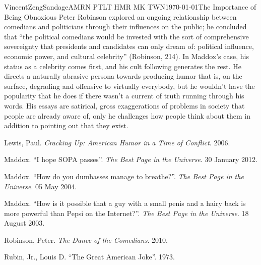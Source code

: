 \documentclass[12 pt]{article}
\begin{document}
\begin{mla}{Vincent}{Zeng}{Sandage}{AMRN PTLT HMR MK TWN}{\today}{The Importance of Being Obnoxious}
	Peter Robinson explored an ongoing relationship between comedians and politicians through their influences on the public; he concluded that ``the political comedians would be invested with the sort of comprehensive sovereignty that presidents and candidates can only dream of: political influence, economic power, and cultural celebrity'' (Robinson, 214). In Maddox's case, his status as a celebrity comes first, and his cult following generates the rest. He directs a naturally abrasive persona towards producing humor that is, on the surface, degrading and offensive to virtually everybody, but he wouldn't have the popularity that he does if there wasn't a current of truth running through his words. His essays are satirical, gross exaggerations of problems in society that people are already aware of, only he challenges how people think about them in addition to pointing out that they exist.

\begin{workscited}

\bibent Lewis, Paul. \textit{Cracking Up: American Humor in a Time of Conflict}. 2006.

\bibent Maddox. ``I hope SOPA passes''. \textit{The Best Page in the Universe}. 30 January 2012. 

\bibent Maddox. ``How do you dumbasses manage to breathe?''. \textit{The Best Page in the Universe}. 05 May 2004. 

\bibent Maddox. ``How is it possible that a guy with a small penis and a hairy back is more powerful than Pepsi on the Internet?''. \textit{The Best Page in the Universe}. 18 August 2003.

\bibent Robinson, Peter. \textit{The Dance of the Comedians}. 2010.

\bibent Rubin, Jr., Louis D. ``The Great American Joke''. 1973.
\end{workscited}
\end{mla}
\end{document}
